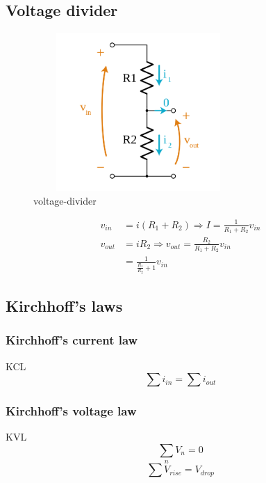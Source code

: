 \newpage
\subsection{Voltage divider}
\begin{figure}[h]
    \vspace{10mm}
    \centering
    \includegraphics[width=8cm, height=6cm]{image/voltage-divider.png}
    \caption{voltage-divider}
\end{figure}

\begin{align*}
  v_{in} &= i(R_1+R_2) \Rightarrow I = \frac{1}{R_1+R_2}v_{in} \\
  v_{out} &= iR_2 \Rightarrow v_{out} = \frac{R_2}{R_1+R_2}v_{in} \\
  &= \frac{1}{\frac{R_1}{R_2}+1}v_{in}
\end{align*}

\subsection{Kirchhoff's laws}
\subsubsection{Kirchhoff's current law}
KCL
\begin{equation} \sum i_{in} = \sum i_{out} \end{equation}

\subsubsection{Kirchhoff's voltage law}
KVL
\begin{equation} \sum_n V_{n} = 0 \end{equation}
\begin{equation} \sum V_{rise} = V_{drop} \end{equation}


